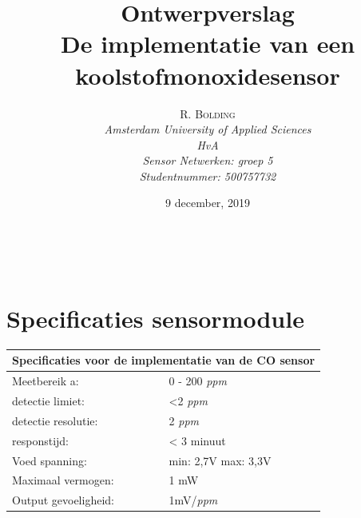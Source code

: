 \documentclass[a4paper, 11pt]{article} %
\title{\textbf{Ontwerpverslag}\\ %
	De implementatie van een koolstofmonoxidesensor} %
\author{\textsc{R. Bolding} %
	\\{\textit{Amsterdam University of Applied Sciences\\ 
			HvA\\
			Sensor Netwerken: groep 5\\
			Studentnummer: 500757732}}} %
\date{9 december, 2019} %
\makeatletter
\renewcommand{\maketitle}{ %
	\begin{flushright} %
		{\LARGE\@title} %
		
		\vspace{50pt} %
		
		{\large\@author} %
		\\\@date %
		
		\vspace{40pt} %
	\end{flushright}
}
\makeatother
\begin{document}
	\captionsetup{justification=centering}
	\renewcommand{\contentsname}{Inhoudsopgave}
	\def\textsubscript#1{\ensuremath{_{\mbox{\textscale{.6}{#1}}}}}
	\hypersetup{hidelinks=true}
	\maketitle %
	
	
	
	
	\vspace{10pt} %
	
	\newpage
	\tableofcontents
	\newpage
	\section{Specificaties sensormodule} \label{sec::specificaties}
	\begin{center}
		\begin{tabular}{ | m{5cm} | m{5cm}| } 
			\hline
			\multicolumn{2}{|c|}{Specificaties voor de implementatie van de CO sensor} \\
			\hline
			Meetbereik a: & 0 - 200 \textit{ppm} \\
			\hline
			detectie limiet:  & <2 \textit{ppm}
			\\ 
			\hline
			detectie resolutie: & 2 \textit{ppm} 
			\\ 
			\hline
			responstijd: & < 3 minuut
			\\ 
			\hline
			Voed spanning: & min: 2,7V max: 3,3V
			\\ 
			\hline
			Maximaal vermogen: & 1 mW
			\\
			\hline
			Output gevoeligheid: & 1mV/\textit{ppm}
			\\
			\hline
		\end{tabular}
	\end{center}
\end{document}
